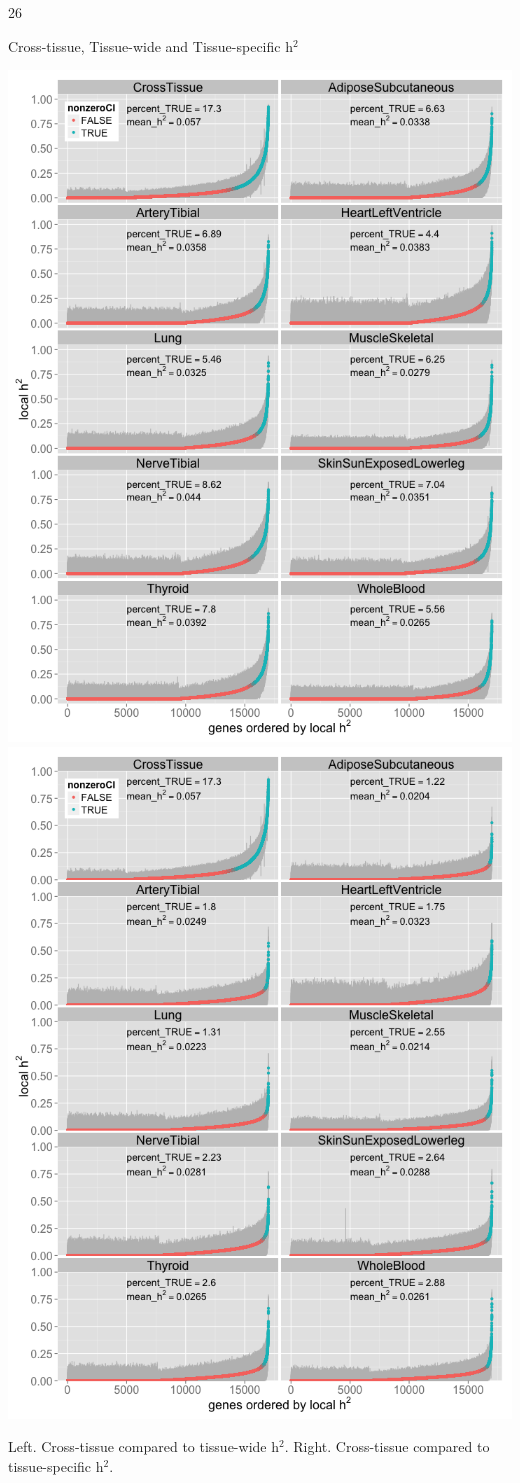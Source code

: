 \documentclass[final]{beamer}
\newcommand{\ColWidth}{26}
\begin{document}
\begin{frame}{}
\begin{textblock}{\ColWidth}
\begin{block}{Cross-tissue, Tissue-wide and Tissue-specific h$^2$ }
	\begin{center}
		\includegraphics[width=.5\textwidth]{plots/Fig4.png}
		\includegraphics[width=.5\textwidth]{plots/FigS1.png}
		
		\tiny{Left. Cross-tissue compared to tissue-wide h$^2$.
		Right. Cross-tissue compared to tissue-specific h$^2$.}
	\end{center}

\end{block}


\end{textblock}
\end{frame}
\end{document}
